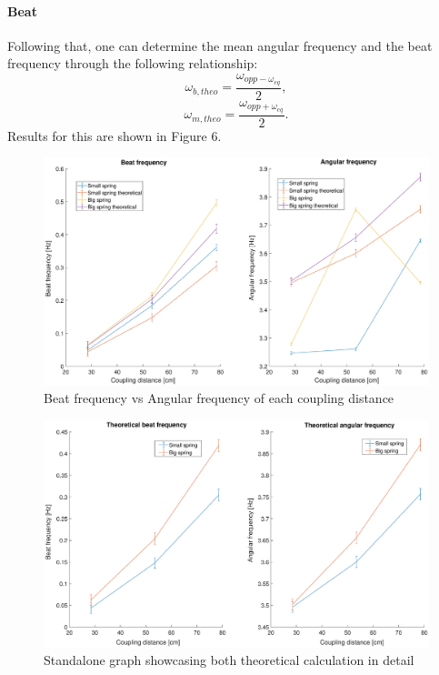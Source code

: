 \documentclass{article}
\begin{document}
\paragraph{Beat}
Following that, one can determine the mean angular frequency and the beat frequency through the following relationship:
\begin{equation}
    \omega_{b,theo} = \frac{\omega_{opp -\omega_{eq}}}{2},
\end{equation}
\begin{equation}
    \omega_{m,theo} = \frac{\omega_{opp +\omega_{eq}}}{2}.
\end{equation}
Results for this are shown in Figure 6.
\begin{figure}[hbt!]
\centering
\includegraphics[width=480pt]{beat-vs-ang-coupled.eps}
\caption{Beat frequency vs Angular frequency of each coupling distance}
\end{figure}
\begin{figure}[hbt!]
\centering
\includegraphics[width=480pt]{theoretical.eps}
\caption{Standalone graph showcasing both theoretical calculation in detail}
\end{figure}
\end{document}

